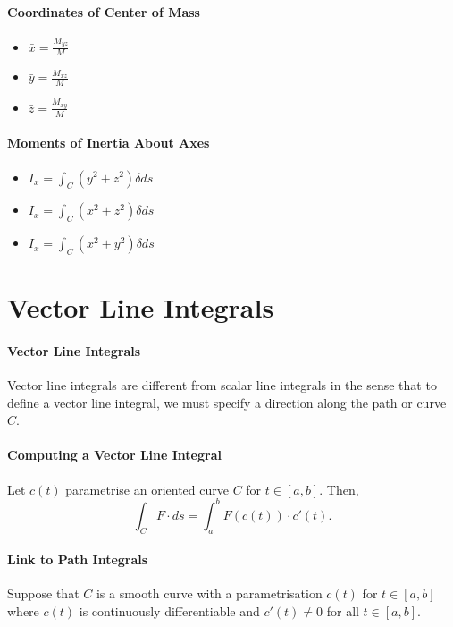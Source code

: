 \documentclass[12pt, letterpaper]{article}
\begin{document}
    \paragraph{Coordinates of Center of Mass}  
    \begin{itemize}
        \item \(\bar{x} = \frac{M_{yz}}{M}\)
        \item \(\bar{y} = \frac{M_{xz}}{M}\)
        \item \(\bar{z} = \frac{M_{xy}}{M}\)
    \end{itemize}
    
    \paragraph{Moments of Inertia About Axes}
    \begin{itemize}
        \item \(I_x = \int_C (y^2 + z^2) \delta ds\)
        \item \(I_x = \int_C (x^2 + z^2) \delta ds\)
        \item \(I_x = \int_C (x^2 + y^2) \delta ds\)
    \end{itemize}
    
    
    \section{Vector Line Integrals}
    \paragraph{Vector Line Integrals}  
    Vector line integrals are different from scalar line integrals in the
    sense that to define a vector line integral, we must specify a direction
    along the path or curve \(C\).

    \paragraph{Computing a Vector Line Integral}
    Let \(c(t)\) parametrise an oriented curve \(C\) for \(t\in [a, b]\).
    Then, 
    \[
        \int_C F\cdot ds = \int_a^b F(c(t)) \cdot c'(t).
    \]
    
    \paragraph{Link to Path Integrals}
    Suppose that \(C\) is a smooth curve with a parametrisation \(c(t)\)
    for \(t\in[a, b]\) where \(c(t)\) is continuously differentiable and
    \(c'(t) \neq 0\) for all \(t\in [a, b]\).
\end{document}
